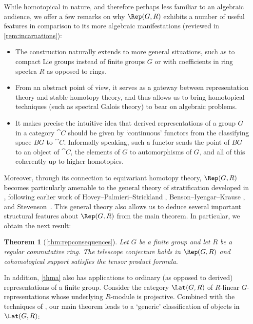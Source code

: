 \documentclass{amsart}%
\numberwithin{equation}{section}%
\newtheorem{thmx}{Theorem}
\theoremstyle{remark}
\begin{document}
While homotopical in nature, and therefore perhaps less familiar to an algebraic audience, we offer a few remarks on why $\Rep(G,R)$ exhibits a number of useful features in comparison to its more algebraic manifestations (reviewed in \cref{rem:incarnations}):
    \begin{itemize}
        \item The construction naturally extends to more general situations, such as to compact Lie groups instead of finite groups $G$ or with coefficients in ring spectra $R$ as opposed to rings. 
        \item From an abstract point of view, it serves as a gateway between representation theory and stable homotopy theory, and thus allows us to bring homotopical techniques (such as spectral Galois theory) to bear on algebraic problems. 
        \item It makes precise the intuitive idea that derived representations of a group $G$ in a category $\cat C$ should be given by `continuous' functors from the classifying space $BG$ to $\cat C$. Informally speaking, such a functor sends the point of $BG$ to an object of $\cat C$, the elements of $G$ to automorphisms of $G$, and all of this coherently up to higher homotopies. 
    \end{itemize}
Moreover, through its connection to equivariant homotopy theory, $\Rep(G,R)$ becomes particularly amenable to the general theory of stratification developed in \cite{bhs1}, following earlier work of Hovey--Palmieri--Strickland \cite{HoveyPalmieriStrickland97}, Benson--Iyengar--Krause \cite{BensonIyengarKrause11b}, and Stevenson~\cite{Stevenson13}. This general theory also allows us to deduce several important structural features about $\Rep(G,R)$ from the main theorem. In particular, we obtain the next result:

\begin{thmx}[\cref{thm:repconsequences}]
Let $G$ be a finite group and let $R$ be a regular commutative ring. The telescope conjecture holds in $\Rep(G,R)$ and cohomological support satisfies the tensor product formula.
\end{thmx}

In addition, \cref{thma} also has applications to ordinary (as opposed to derived) representations of a finite group. Consider the category $\Lat(G,R)$ of $R$-linear $G$-representations whose underlying $R$-module is projective. Combined with the techniques of \cite{barthel_integral1}, our main theorem leads to a `generic' classification of objects in $\Lat(G,R)$:
\end{document}
